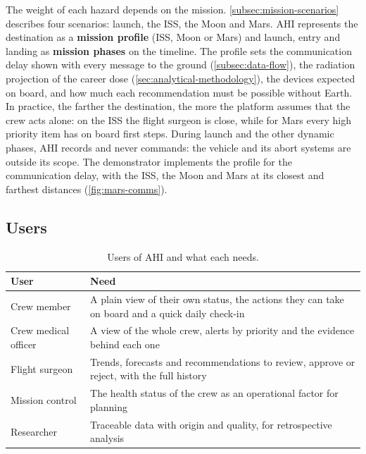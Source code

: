 The weight of each hazard depends on the mission. \ref{subsec:mission-scenarios} describes four scenarios: launch, the ISS, the Moon and Mars. AHI represents the destination as a \textbf{mission profile} (ISS, Moon or Mars) and launch, entry and landing as \textbf{mission phases} on the timeline. The profile sets the communication delay shown with every message to the ground (\ref{subsec:data-flow}), the radiation projection of the career dose (\ref{sec:analytical-methodology}), the devices expected on board, and how much each recommendation must be possible without Earth. In practice, the farther the destination, the more the platform assumes that the crew acts alone: on the ISS the flight surgeon is close, while for Mars every high priority item has on board first steps. During launch and the other dynamic phases, AHI records and never commands: the vehicle and its abort systems are outside its scope. The demonstrator implements the profile for the communication delay, with the ISS, the Moon and Mars at its closest and farthest distances (\ref{fig:mars-comms}).

\subsection{Users}
\label{subsec:users}

\begin{table}[htbp]
\centering
\vspace{0.8em}
\caption{Users of AHI and what each needs.}
\label{tab:users}
\small
\begin{tabular}{p{3.6cm}p{10.4cm}}
\hline
\textbf{User} & \textbf{Need} \\
\hline
Crew member & A plain view of their own status, the actions they can take on board and a quick daily check-in \\
Crew medical officer & A view of the whole crew, alerts by priority and the evidence behind each one \\
Flight surgeon & Trends, forecasts and recommendations to review, approve or reject, with the full history \\
Mission control & The health status of the crew as an operational factor for planning \\
Researcher & Traceable data with origin and quality, for retrospective analysis \\
\hline
\end{tabular}
\vspace{1.2em}
\end{table}

